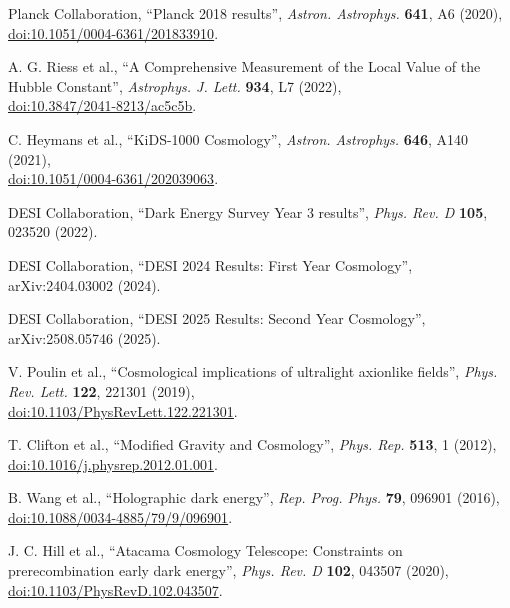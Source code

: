 \documentclass[aps,prd,twocolumn,superscriptaddress,nofootinbib,floatfix,preprintnumbers]{revtex4-2}
\begin{document}
\begin{thebibliography}{99}


Planck Collaboration, 
``Planck 2018 results'', 
\emph{Astron. Astrophys.} \textbf{641}, A6 (2020), \\
\href{https://doi.org/10.1051/0004-6361/201833910}{doi:10.1051/0004-6361/201833910}.

A. G. Riess et al., 
``A Comprehensive Measurement of the Local Value of the Hubble Constant'', 
\emph{Astrophys. J. Lett.} \textbf{934}, L7 (2022), \\
\href{https://doi.org/10.3847/2041-8213/ac5c5b}{doi:10.3847/2041-8213/ac5c5b}.

C. Heymans et al., 
``KiDS-1000 Cosmology'', 
\emph{Astron. Astrophys.} \textbf{646}, A140 (2021), \\
\href{https://doi.org/10.1051/0004-6361/202039063}{doi:10.1051/0004-6361/202039063}.

DESI Collaboration, 
``Dark Energy Survey Year 3 results'', 
\emph{Phys. Rev. D} \textbf{105}, 023520 (2022).

DESI Collaboration, 
``DESI 2024 Results: First Year Cosmology'', 
arXiv:2404.03002 (2024).

DESI Collaboration, 
``DESI 2025 Results: Second Year Cosmology'', 
arXiv:2508.05746 (2025).

V. Poulin et al., 
``Cosmological implications of ultralight axionlike fields'', 
\emph{Phys. Rev. Lett.} \textbf{122}, 221301 (2019), \\
\href{https://doi.org/10.1103/PhysRevLett.122.221301}{doi:10.1103/PhysRevLett.122.221301}.

T. Clifton et al., 
``Modified Gravity and Cosmology'', 
\emph{Phys. Rep.} \textbf{513}, 1 (2012), \\
\href{https://doi.org/10.1016/j.physrep.2012.01.001}{doi:10.1016/j.physrep.2012.01.001}.

B. Wang et al., 
``Holographic dark energy'', 
\emph{Rep. Prog. Phys.} \textbf{79}, 096901 (2016), \\
\href{https://doi.org/10.1088/0034-4885/79/9/096901}{doi:10.1088/0034-4885/79/9/096901}.

J. C. Hill et al., 
``Atacama Cosmology Telescope: Constraints on prerecombination early dark energy'', 
\emph{Phys. Rev. D} \textbf{102}, 043507 (2020), \\
\href{https://doi.org/10.1103/PhysRevD.102.043507}{doi:10.1103/PhysRevD.102.043507}.


\end{thebibliography}
\end{document}
